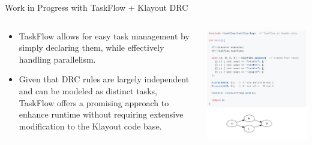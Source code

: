 \documentclass[aspectratio=169]{beamer} %
\begin{document}
\begin{frame}{Work in Progress with TaskFlow + Klayout DRC}
    \begin{columns}[T]
        \begin{column}{.6\textwidth}
        \begin{itemize}
            \item TaskFlow allows for easy task management by simply declaring them, while effectively handling parallelism.
            \item Given that DRC rules are largely independent and can be modeled as distinct tasks, TaskFlow offers a promising approach to enhance runtime without requiring extensive modification to the Klayout code base.
        \end{itemize}
        \end{column}
        \begin{column}{.4\textwidth}
        \begin{center}
            \includegraphics[width=\textwidth,height=0.8\textheight,keepaspectratio]{taskflow.png}
        \end{center}
        \end{column}
    \end{columns}
\end{frame}
\end{document}
